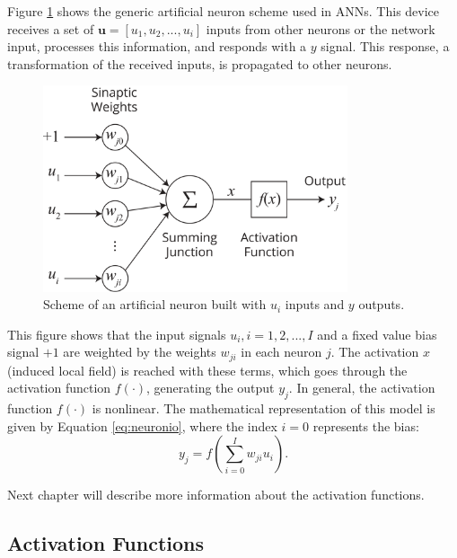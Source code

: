 Figure \ref{fig:neuronio} shows the generic artificial neuron scheme used in ANNs. This device receives a set of $\textbf{u} = [ u_1 , u_2 ,..., u_i]$ inputs from other neurons or the network input, processes this information, and responds with a $y$ signal. This response, a transformation of the received inputs, is propagated to other neurons.

\begin{figure}[h!]
	\caption{Scheme of an artificial neuron built with $u_i$ inputs and $y$ outputs.}
	\vspace{0.2cm}
	\begin{center}
		\includegraphics[width=0.8\textwidth]{neuronioArtificial.png}
	\end{center}
	\label{fig:neuronio}
\end{figure}

This figure shows that the input signals $u_i , i=1, 2,..., I$ and a fixed value bias signal $+1$ are weighted by the weights $w_{ji}$ in each neuron $j$. The activation $x$ (induced local field) is reached with these terms, which goes through the activation function $f(\cdot)$, generating the output $y_j$. In general, the activation function $f(\cdot)$ is nonlinear. The mathematical representation of this model is given by Equation \ref{eq:neuronio}, %
where
the index $i=0$ represents the bias:
\begin{equation}
    \label{eq:neuronio}
    y_j = f \left( \sum_{i=0}^I w_{ji} u_i  \right).
\end{equation}

Next chapter will describe more information about the activation functions.

\subsection{Activation Functions}
\label{ssec:ativacao}


